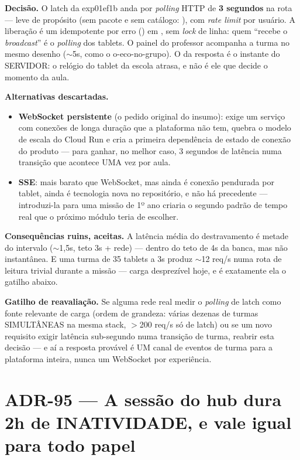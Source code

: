 \textbf{Decisão.} O latch da exp01ef1b anda por \emph{polling} HTTP de
\textbf{3 segundos} na rota  --- leve de propósito
(sem pacote e sem catálogo: ), com \emph{rate
limit} por usuário. A liberação é um  idempotente por erro
() em ,
sem \emph{lock} de linha: quem \enquote{recebe o \emph{broadcast}} é o
\emph{polling} dos tablets. O painel do professor acompanha a turma no mesmo
desenho (\(\sim\)5s, como o o-eco-no-grupo). O  da resposta é o
instante do SERVIDOR: o relógio do tablet da escola atrasa, e não é ele que
decide o momento da aula.

\textbf{Alternativas descartadas.}

\begin{itemize}
  \item \textbf{WebSocket persistente} (o pedido original do insumo): exige um
    serviço com conexões de longa duração que a plataforma não tem, quebra o
    modelo de escala do Cloud Run e cria a primeira dependência de estado de
    conexão do produto --- para ganhar, no melhor caso, 3 segundos de latência
    numa transição que acontece UMA vez por aula.
  \item \textbf{SSE}: mais barato que WebSocket, mas ainda é conexão pendurada
    por tablet, ainda é tecnologia nova no repositório, e não há precedente ---
    introduzi-la para uma missão de 1º ano criaria o segundo padrão de
    tempo real que o próximo módulo teria de escolher.
\end{itemize}

\textbf{Consequências ruins, aceitas.} A latência média do destravamento é
metade do intervalo (\(\sim\)1,5s, teto 3s + rede) --- dentro do teto de 4s da
banca, mas não instantânea. E uma turma de 35 tablets a 3s produz
\(\sim\)12 req/s numa rota de leitura trivial durante a missão --- carga
desprezível hoje, e é exatamente ela o gatilho abaixo.

\textbf{Gatilho de reavaliação.} Se alguma rede real medir o \emph{polling} de
latch como fonte relevante de carga (ordem de grandeza: várias dezenas de
turmas SIMULTÂNEAS na mesma stack, \(>\)200 req/s só de latch) ou se um novo
requisito exigir latência sub-segundo numa transição de turma, reabrir esta
decisão --- e aí a resposta provável é UM canal de eventos de turma para a
plataforma inteira, nunca um WebSocket por experiência.
\section{ADR-95 --- A sessão do hub dura 2h de INATIVIDADE, e vale igual para
todo papel}
\label{adr:sessao-duas-horas}

